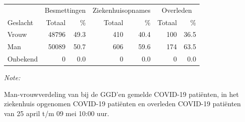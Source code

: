 \documentclass[
  english,
  man,floatsintext]{apa6}
\begin{document}
\begin{table}
\centering\begingroup\fontsize{11}{13}\selectfont

\begin{threeparttable}
\begin{tabular}{lrrrrrr}
\toprule
\multicolumn{1}{c}{ } & \multicolumn{2}{c}{Besmettingen} & \multicolumn{2}{c}{Ziekenhuisopnames} & \multicolumn{2}{c}{Overleden} \\
\cmidrule(l{3pt}r{3pt}){2-3} \cmidrule(l{3pt}r{3pt}){4-5} \cmidrule(l{3pt}r{3pt}){6-7}
Geslacht & Totaal & \% & Totaal & \% & Totaal & \%\\
\midrule
Vrouw & 48796 & 49.3 & 410 & 40.4 & 100 & 36.5\\
Man & 50089 & 50.7 & 606 & 59.6 & 174 & 63.5\\
Onbekend & 0 & 0.0 & 0 & 0.0 & 0 & 0.0\\
\bottomrule
\end{tabular}
\begin{tablenotes}
\item \textit{Note: } 
\item Man-vrouwverdeling van bij de GGD’en gemelde COVID-19 patiënten, in het ziekenhuis opgenomen COVID-19 patiënten en overleden COVID-19 patiënten van 25 april t/m 09 mei 10:00 uur.
\end{tablenotes}
\end{threeparttable}
\endgroup{}
\end{table}
\newpage
\end{document}

